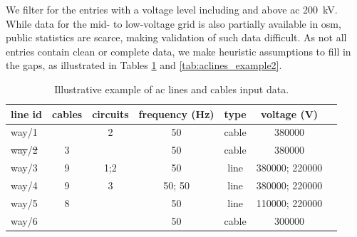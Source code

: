 \documentclass[fleqn,10pt]{wlscirep}
\providecommand{\DIFaddtex}[1]{{\protect\color{blue}\uwave{#1}}} %
\providecommand{\DIFdeltex}[1]{{\protect\color{red}\sout{#1}}}                      %
\providecommand{\DIFaddFL}[1]{\DIFadd{#1}} %
\providecommand{\DIFdelFL}[1]{\DIFdel{#1}} %
\providecommand{\DIFaddbeginFL}{} %
\providecommand{\DIFaddendFL}{} %
\providecommand{\DIFdelbeginFL}{} %
\providecommand{\DIFdelendFL}{} %
\providecommand{\DIFadd}[1]{\texorpdfstring{\DIFaddtex{#1}}{#1}} %
\providecommand{\DIFdel}[1]{\texorpdfstring{\DIFdeltex{#1}}{}} %
\begin{document}
We filter for the entries with a voltage level including and above \acrshort{ac} \SI{200}{\kilo\volt}. While data for the mid- to low-voltage grid is also partially available in \gls{osm}, public statistics are scarce, making validation of such data difficult. As not all entries contain clean or complete data, we make heuristic assumptions to fill in the gaps, as illustrated in Tables \ref{tab:aclines_example1} and \ref{tab:aclines_example2}. 

\begin{table}[!htbp]
    \centering
    \begin{tabular}{|l|c|c|c|c|c|c|}
    \hline
    \textbf{line id} & \textbf{cables} & \textbf{circuits} & \textbf{frequency} (Hz) & \textbf{type} & \textbf{voltage}  (V) \\
    \hline
    way/1 &  & 2 & 50 & cable & \SI{380000}{} \\
    \hline
    \DIFdelbeginFL \DIFdelFL{way}\DIFdelendFL \DIFaddbeginFL \DIFaddFL{relation}\DIFaddendFL /\DIFdelbeginFL \DIFdelFL{2 }\DIFdelendFL \DIFaddbeginFL \DIFaddFL{1 }\DIFaddendFL & 3 &  & 50 & cable & \SI{380000}{} \\
    \hline
    way/3 & 9 & 1;2 & 50 & line & \SI{380000}{}; \SI{220000}{} \\
    \hline
    way/4 & 9 & 3 & 50; 50 & line & \SI{380000}{}; \SI{220000}{} \\
    \hline
    way/5 & 8 &  & 50 & line & \SI{110000}{}; \SI{220000}{} \\
    \hline
    way/6 &  &  & 50 & cable & \SI{300000}{}\\
    \hline
    \end{tabular}
    \caption{Illustrative example of \acrshort{ac} lines and cables input data.}
    \label{tab:aclines_example1}
\end{table}
\end{document}
